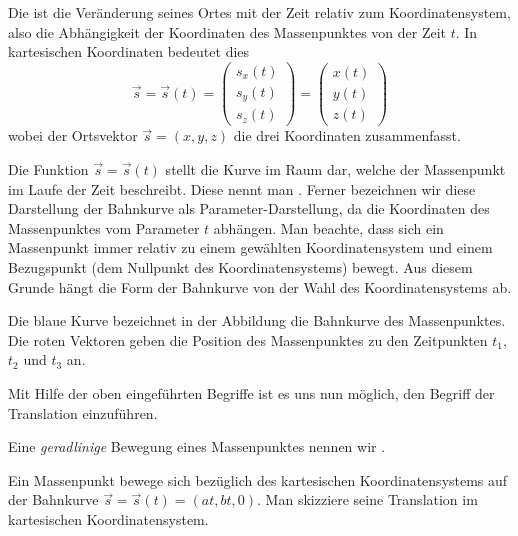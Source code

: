 \begin{MContent}
\begin{MInfo}
  Die  ist die Ver\"anderung seines Ortes mit der Zeit relativ zum Koordinatensystem, also die Abh\"angigkeit der Koordinaten des Massenpunktes von der Zeit $t$. In kartesischen Koordinaten bedeutet dies
\begin{equation*}
\vec{s} = \vec{s}(t)=\left(\begin{array}{c} s_x(t) \\ s_y(t) \\ s_z(t) \end{array}\right)=\left(\begin{array}{c} x(t) \\ y(t) \\ z(t) \end{array}\right)
\end{equation*}
wobei der Ortsvektor $\vec{s}=(x,y,z)$ die drei Koordinaten zusammenfasst.
\end{MInfo}



Die Funktion $\vec{s}=\vec{s}(t)$ stellt die Kurve im Raum dar, welche der Massenpunkt im Laufe der Zeit beschreibt. Diese nennt man . Ferner bezeichnen wir diese Darstellung der Bahnkurve als Parameter-Darstellung, da die Koordinaten des Massenpunktes vom Parameter $t$ abh\"angen. Man beachte, dass sich ein Massenpunkt immer relativ zu einem gew\"ahlten Koordinatensystem und einem Bezugspunkt (dem Nullpunkt des Koordinatensystems) bewegt. Aus diesem Grunde h\"angt die Form der Bahnkurve von der Wahl des Koordinatensystems ab. 
 


Die blaue Kurve bezeichnet in der Abbildung die Bahnkurve des Massenpunktes. Die roten Vektoren geben die Position des Massenpunktes zu den Zeitpunkten $t_1$, $t_2$ und $t_3$ an.

Mit Hilfe der oben eingef\"uhrten Begriffe ist es uns nun m\"oglich, den Begriff der Translation einzuf\"uhren.

\begin{MInfo}
Eine \textit{geradlinige} Bewegung eines Massenpunktes nennen wir .
\end{MInfo}

\begin{MExercise}
Ein Massenpunkt bewege sich bez\"uglich des kartesischen Koordinatensystems auf der Bahnkurve $\vec{s}=\vec{s}(t)=(a t,b t,0)$. Man skizziere seine Translation im kartesischen Koordinatensystem.


\end{MExercise}
\end{MContent}
